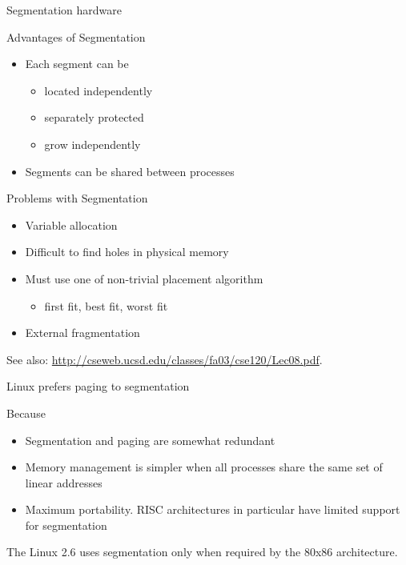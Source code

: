 \begin{frame}{Segmentation hardware}
  \centering
  \mode<beamer>{ \texttt{[image: osc-8-49]} }%
  \label{fig:segmentation-hardware}
\end{frame}

\begin{frame}
  \centering
\end{frame}

\begin{frame}
  \begin{iblock}{Advantages of Segmentation}
    \begin{itemize}
    \item Each segment can be
      \begin{itemize}
      \item located independently
      \item separately protected
      \item grow independently
      \end{itemize}
    \item Segments can be shared between processes
    \end{itemize}
  \end{iblock}
  \begin{iblock}{Problems with Segmentation}
    \begin{itemize}
    \item Variable allocation
    \item Difficult to find holes in physical memory
    \item Must use one of non-trivial placement algorithm
      \begin{itemize}
      \item first fit, best fit, worst fit
      \end{itemize}
    \item External fragmentation
    \end{itemize}
  \end{iblock}
\end{frame}

See also: \url{http://cseweb.ucsd.edu/classes/fa03/cse120/Lec08.pdf}.

\begin{frame}{Linux prefers paging to segmentation}
  \begin{iblock}{Because}
  \begin{itemize}
  \item Segmentation and paging are somewhat redundant
  \item Memory management is simpler when all processes share the same set of linear addresses
  \item Maximum portability. RISC architectures in particular have limited support for segmentation
  \end{itemize}
  \end{iblock}
  The Linux 2.6 uses segmentation only when required by the 80x86 architecture.
\end{frame}


